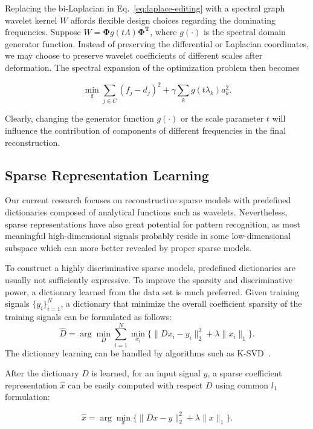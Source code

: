 Replacing the bi-Laplacian in Eq.~\ref{eq:laplace-editing} with a spectral graph wavelet kernel
$W$ affords flexible design choices regarding the dominating frequencies. Suppose
$W=\mathbf{\Phi}g(t\Lambda)\mathbf{\Phi^T}$, where $g(\cdot)$ is the spectral domain generator
function. Instead of preserving the differential or Laplacian coordinates, we may choose
to preserve wavelet coefficients of different scales after deformation. The spectral expansion
of the optimization problem then becomes

\begin{equation}
\label{eq:sgw-editing}
\min_\mathbf{f} \sum_{j\in C} (f_j - d_j)^2 + \gamma \sum_k g(t\lambda_k) a_k^2.
\end{equation}

Clearly, changing the generator function $g(\cdot)$ or the scale parameter $t$ will
influence the contribution of components of different frequencies in the final reconstruction.

\subsection*{Sparse Representation Learning}
Our current research focuses on reconstructive sparse models with predefined dictionaries
composed of analytical functions such as wavelets. Nevertheless, sparse representations have
also great potential for pattern recognition, as most meaningful high-dimensional
signals probably reside in some low-dimensional subspace which can more better revealed
by proper sparse models.

To construct a highly discriminative sparse models, predefined dictionaries are usually not
sufficiently expressive. To improve the sparsity and discriminative power, a dictionary learned from
the data set is much preferred. Given training signals $\{y_i\}_{i=1}^N$, a dictionary that
minimize the overall coefficient sparsity of the training signals can be formulated as follows:
\begin{equation}
\label{eq:dictionary-learning}
\hat{D}=\arg\min_D\sum_{i=1}^N \min_{x_i}\{\|Dx_i - y_i\|_2^2 + \lambda\|x_i\|_1\}.
\end{equation}
The dictionary learning can be handled by algorithms such as K-SVD~\cite{Aharon2006}.

After the dictionary $D$ is learned, for an input signal $y$, a sparse coefficient
representation $\hat{x}$ can be easily computed with respect $D$ using
common $l_1$ formulation:

\begin{equation}
\hat{x} = \arg\min_{x} \{\|Dx - y\|_2^2 + \lambda\|x\|_1\}.
\end{equation}

